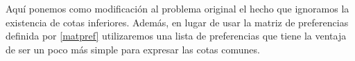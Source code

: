 \begin{enumerate}

\end{enumerate}

Aquí ponemos como modificación al problema original el hecho que ignoramos la existencia de cotas inferiores.
Además, en lugar de usar la matriz de preferencias definida por \ref{matpref} utilizaremos una lista de preferencias que tiene la ventaja de ser un poco más simple para expresar las cotas comunes. 

